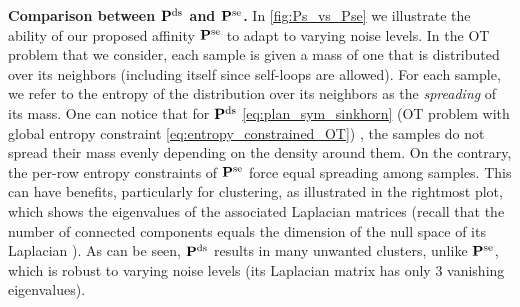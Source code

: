 \textbf{Comparison between $\mathbf{P}^{\mathrm{ds}}$ and $\mathbf{P}^{\mathrm{se}}$.} In \cref{fig:Ps_vs_Pse} we illustrate the ability of our proposed affinity $\mathbf{P}^{\mathrm{se}}$ to adapt to varying noise levels. In the OT problem that we consider, each sample is given a mass of one that is distributed over its neighbors (including itself since self-loops are allowed). For each sample, we refer to the entropy of the distribution over its neighbors as the \emph{spreading} of its mass. One can notice that for $\mathbf{P}^{\mathrm{ds}}$ \eqref{eq:plan_sym_sinkhorn} 
(OT problem with global entropy constraint \eqref{eq:entropy_constrained_OT})
, the samples do not spread their mass evenly depending on the density around them. On the contrary, the per-row entropy constraints of $\mathbf{P}^{\mathrm{se}}$ force equal spreading among samples.
This can have benefits, particularly for clustering, as illustrated in the rightmost plot, which shows the eigenvalues of the associated Laplacian matrices (recall that the number of connected components equals the dimension of the null space of its Laplacian \citep{chung1997spectral}). As can be seen, $\mathbf{P}^{\mathrm{ds}}$ results in many unwanted clusters, unlike $\mathbf{P}^{\mathrm{se}}$, which is robust to varying noise levels (its Laplacian matrix has only $3$ vanishing eigenvalues). 
